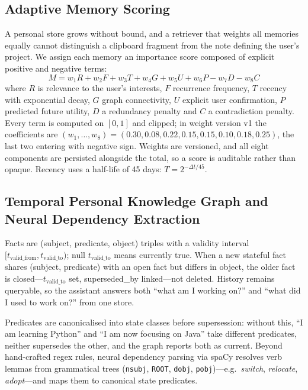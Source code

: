 \documentclass[conference]{IEEEtran}
\begin{document}
\subsection{Adaptive Memory Scoring}
A personal store grows without bound, and a retriever that weights all memories equally cannot distinguish a clipboard fragment from the note defining the user's project. We assign each memory an importance score composed of explicit positive and negative terms:
\begin{equation}
M = w_1 R + w_2 F + w_3 T + w_4 G + w_5 U + w_6 P - w_7 D - w_8 C
\label{eq:score}
\end{equation}
where $R$ is relevance to the user's interests, $F$ recurrence frequency, $T$ recency with exponential decay, $G$ graph connectivity, $U$ explicit user confirmation, $P$ predicted future utility, $D$ a redundancy penalty and $C$ a contradiction penalty. Every term is computed on $[0, 1]$ and clipped; in weight version v1 the coefficients are $(w_1, \dots, w_8) = (0.30, 0.08, 0.22, 0.15, 0.15, 0.10, 0.18, 0.25)$, the last two entering with negative sign. Weights are versioned, and all eight components are persisted alongside the total, so a score is auditable rather than opaque. Recency uses a half-life of 45 days: $T = 2^{-\Delta t / 45}$.

\subsection{Temporal Personal Knowledge Graph and Neural Dependency Extraction}
Facts are (subject, predicate, object) triples with a validity interval $[t_{\mathrm{valid\_from}}, t_{\mathrm{valid\_to}})$; null $t_{\mathrm{valid\_to}}$ means currently true. When a new stateful fact shares (subject, predicate) with an open fact but differs in object, the older fact is closed---$t_{\mathrm{valid\_to}}$ set, superseded\_by linked---not deleted. History remains queryable, so the assistant answers both ``what am I working on?'' and ``what did I used to work on?'' from one store.

Predicates are canonicalised into state classes before supersession: without this, ``I am learning Python'' and ``I am now focusing on Java'' take different predicates, neither supersedes the other, and the graph reports both as current. Beyond hand-crafted regex rules, neural dependency parsing via spaCy resolves verb lemmas from grammatical trees (\texttt{nsubj}, \texttt{ROOT}, \texttt{dobj}, \texttt{pobj})---e.g.\ \emph{switch}, \emph{relocate}, \emph{adopt}---and maps them to canonical state predicates.
\end{document}
